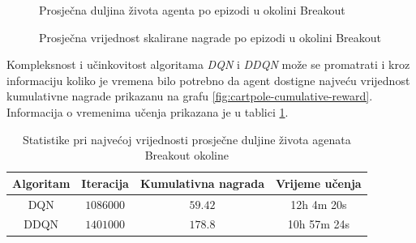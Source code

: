 \begin{figure}[H]
    \centering
    \caption{Prosječna duljina života agenta po epizodi u okolini Breakout}
    \label{fig:breakout-avg-ep-len}
\end{figure}

\begin{figure}[H]
    \centering
    \caption{Prosječna vrijednost skalirane nagrade po epizodi u okolini Breakout}
    \label{fig:breakout-avg-rew}
\end{figure}

Kompleksnost i učinkovitost algoritama \textit{DQN} i \textit{DDQN} može se promatrati i kroz informaciju koliko je vremena bilo potrebno da agent dostigne najveću vrijednost kumulativne nagrade prikazanu na grafu \ref{fig:cartpole-cumulative-reward}. Informacija o vremenima učenja prikazana je u tablici \ref{table:breakout-stats}.

\begin{table}[H]
    \centering
    \caption{Statistike pri najvećoj vrijednosti prosječne duljine života agenata Breakout okoline}
    \begin{tabular}{c c c c}
        \toprule
        Algoritam & Iteracija & Kumulativna nagrada & Vrijeme učenja \\
        \midrule
        DQN & $1086000$ & $59.42$ & 12h 4m 20s \\
        DDQN & $1401000$ & $178.8$ & 10h 57m 24s \\
        \bottomrule
    \end{tabular}
    \label{table:breakout-stats}
\end{table}

